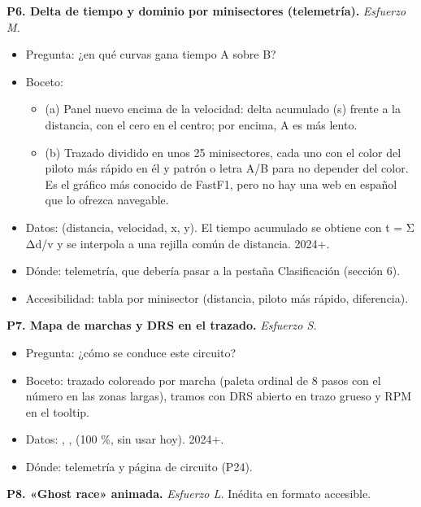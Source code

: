 \textbf{P6. Delta de tiempo y dominio por minisectores (telemetría).} \emph{Esfuerzo M.}

\begin{itemize}
\item Pregunta: ¿en qué curvas gana tiempo A sobre B?
\item Boceto:
\begin{itemize}
\item (a) Panel nuevo encima de la velocidad: delta acumulado (s) frente a la distancia, con el cero en el centro; por encima, A es más lento.
\item (b) Trazado dividido en unos 25 minisectores, cada uno con el color del piloto más rápido en él y patrón o letra A/B para no depender del color. Es el gráfico más conocido de FastF1, pero no hay una web en español que lo ofrezca navegable.
\end{itemize}
\item Datos:  (distancia, velocidad, x, y). El tiempo acumulado se obtiene con t = Σ Δd/v y se interpola a una rejilla común de distancia. 2024+.
\item Dónde: telemetría, que debería pasar a la pestaña Clasificación (sección 6).
\item Accesibilidad: tabla por minisector (distancia, piloto más rápido, diferencia).
\end{itemize}

\textbf{P7. Mapa de marchas y DRS en el trazado.} \emph{Esfuerzo S.}

\begin{itemize}
\item Pregunta: ¿cómo se conduce este circuito?
\item Boceto: trazado coloreado por marcha (paleta ordinal de 8 pasos con el número en las zonas largas), tramos con DRS abierto en trazo grueso y RPM en el tooltip.
\item Datos: , ,  (100 \%, sin usar hoy). 2024+.
\item Dónde: telemetría y página de circuito (P24).
\end{itemize}

\textbf{P8. «Ghost race» animada.} \emph{Esfuerzo L.} Inédita en formato accesible.

